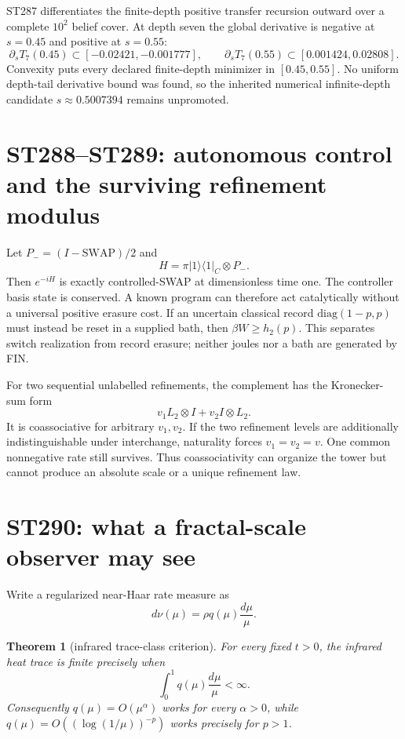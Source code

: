 \documentclass[11pt,a4paper]{article}
\newtheorem{theorem}{Theorem}[section]
\begin{document}
ST287 differentiates the finite-depth positive transfer recursion outward over a complete
$10^2$ belief cover. At depth seven the global derivative is negative at $s=0.45$ and
positive at $s=0.55$:
\[
\partial_sT_7(0.45)\subset[-0.02421,-0.001777],\qquad
\partial_sT_7(0.55)\subset[0.001424,0.02808].
\]
Convexity puts every declared finite-depth minimizer in $[0.45,0.55]$. No uniform
depth-tail derivative bound was found, so the inherited numerical infinite-depth candidate
$s\approx0.5007394$ remains unpromoted.

\section{ST288--ST289: autonomous control and the surviving refinement modulus}

Let $P_-=(I-\mathrm{SWAP})/2$ and
\[
H=\pi|1\rangle\!\langle1|_C\otimes P_-.
\]
Then $e^{-iH}$ is exactly controlled-SWAP at dimensionless time one. The controller basis
state is conserved. A known program can therefore act catalytically without a universal
positive erasure cost. If an uncertain classical record $\mathrm{diag}(1-p,p)$ must instead
be reset in a supplied bath, then $\beta W\ge h_2(p)$. This separates switch realization
from record erasure; neither joules nor a bath are generated by FIN.

For two sequential unlabelled refinements, the complement has the Kronecker-sum form
\[
v_1L_2\otimes I+v_2I\otimes L_2.
\]
It is coassociative for arbitrary $v_1,v_2$. If the two refinement levels are additionally
indistinguishable under interchange, naturality forces $v_1=v_2=v$. One common nonnegative
rate still survives. Thus coassociativity can organize the tower but cannot produce an
absolute scale or a unique refinement law.

\section{ST290: what a fractal-scale observer may see}

Write a regularized near-Haar rate measure as
\[
d\nu(\mu)=\rho q(\mu)\frac{d\mu}{\mu}.
\]

\begin{theorem}[infrared trace-class criterion]
For every fixed $t>0$, the infrared heat trace is finite precisely when
\[
\int_0^1q(\mu)\frac{d\mu}{\mu}<\infty.
\]
Consequently $q(\mu)=O(\mu^\alpha)$ works for every $\alpha>0$, while
$q(\mu)=O((\log(1/\mu))^{-p})$ works precisely for $p>1$.
\end{theorem}
\end{document}
